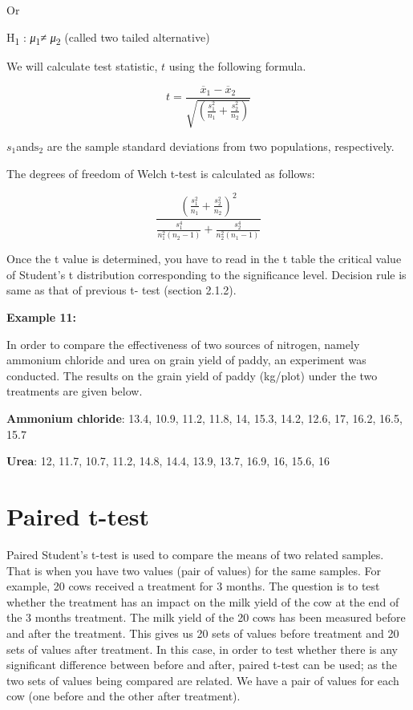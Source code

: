 \documentclass[
]{book}
\begin{document}
Or

H\textsubscript{1} : \emph{μ}\textsubscript{1}≠ \emph{μ}\textsubscript{2} (called two tailed alternative)

We will calculate test statistic, \(t\) using the following formula.

\[t = \frac{{\overline{x}}_{1} - {\overline{x}}_{2}}{\sqrt{\left( \frac{s_{1}^{2}}{n_{1}} + \frac{s_{2}^{2}}{n_{2}} \right)}}\]

\(s_{1}\)and\(\text{s}_{2}\) are the sample standard deviations from two populations, respectively.

The degrees of freedom of Welch t-test is calculated as follows:

\[\frac{\left( \frac{s_{1}^{2}}{n_{1}} + \frac{s_{2}^{2}}{n_{2}} \right)^{2}}{\frac{s_{1}^{4}}{n_{1}^{2}\left( n_{2} - 1 \right)} + \frac{s_{2}^{4}}{n_{2}^{2}\left( n_{1} - 1 \right)}}\]

Once the t value is determined, you have to read in the t table the critical value of Student's t distribution corresponding to the significance level. Decision rule is same as that of previous t- test (section 2.1.2).

\textbf{Example 11:}

In order to compare the effectiveness of two sources of nitrogen, namely ammonium chloride and urea on grain yield of paddy, an experiment was conducted. The results on the grain yield of paddy (kg/plot) under the two treatments are given below.

\textbf{Ammonium chloride}: 13.4, 10.9, 11.2, 11.8, 14, 15.3, 14.2, 12.6, 17, 16.2, 16.5, 15.7

\textbf{Urea}: 12, 11.7, 10.7, 11.2, 14.8, 14.4, 13.9, 13.7, 16.9, 16, 15.6, 16

\hypertarget{paired-t-test}{%
\section{Paired t-test}\label{paired-t-test}}

Paired Student's t-test is used to compare the means of two related samples. That is when you have two values (pair of values) for the same samples. For example, 20 cows received a treatment for 3 months. The question is to test whether the treatment has an impact on the milk yield of the cow at the end of the 3 months treatment. The milk yield of the 20 cows has been measured before and after the treatment. This gives us 20 sets of values before treatment and 20 sets of values after treatment. In this case, in order to test whether there is any significant difference between before and after, paired t-test can be used; as the two sets of values being compared are related. We have a pair of values for each cow (one before and the other after treatment).
\end{document}
